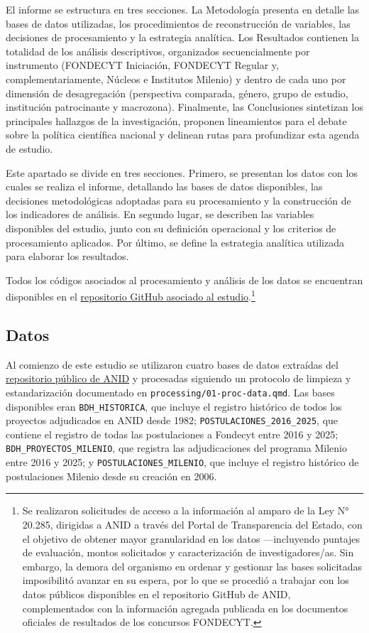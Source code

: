 \documentclass[
  12pt,
  letterpaper,
]{article}
\begin{document}
El informe se estructura en tres secciones. La Metodología presenta en
detalle las bases de datos utilizadas, los procedimientos de
reconstrucción de variables, las decisiones de procesamiento y la
estrategia analítica. Los Resultados contienen la totalidad de los
análisis descriptivos, organizados secuencialmente por instrumento
(FONDECYT Iniciación, FONDECYT Regular y, complementariamente, Núcleos e
Institutos Milenio) y dentro de cada uno por dimensión de desagregación
(perspectiva comparada, género, grupo de estudio, institución
patrocinante y macrozona). Finalmente, las Conclusiones sintetizan los
principales hallazgos de la investigación, proponen lineamientos para el
debate sobre la política científica nacional y delinean rutas para
profundizar esta agenda de estudio.

Este apartado se divide en tres secciones. Primero, se presentan los
datos con los cuales se realiza el informe, detallando las bases de
datos disponibles, las decisiones metodológicas adoptadas para su
procesamiento y la construcción de los indicadores de análisis. En
segundo lugar, se describen las variables disponibles del estudio, junto
con su definición operacional y los criterios de procesamiento
aplicados. Por último, se define la estrategia analítica utilizada para
elaborar los resultados.

Todos los códigos asociados al procesamiento y análisis de los datos se
encuentran disponibles en el
\href{https://github.com/renejcanales/fondos-css}{repositorio GitHub
asociado al estudio}.\footnote{Se realizaron solicitudes de acceso a la
  información al amparo de la Ley N° 20.285, dirigidas a ANID a través
  del Portal de Transparencia del Estado, con el objetivo de obtener
  mayor granularidad en los datos ---incluyendo puntajes de evaluación,
  montos solicitados y caracterización de investigadores/as. Sin
  embargo, la demora del organismo en ordenar y gestionar las bases
  solicitadas imposibilitó avanzar en su espera, por lo que se procedió
  a trabajar con los datos públicos disponibles en el repositorio GitHub
  de ANID, complementados con la información agregada publicada en los
  documentos oficiales de resultados de los concursos FONDECYT.}

\subsection{Datos}\label{datos}

Al comienzo de este estudio se utilizaron cuatro bases de datos
extraídas del \href{https://github.com/ANID-GITHUB}{repositorio público
de ANID} y procesadas siguiendo un protocolo de limpieza y
estandarización documentado en \texttt{processing/01-proc-data.qmd}. Las
bases disponibles eran \texttt{BDH\_HISTORICA}, que incluye el registro
histórico de todos los proyectos adjudicados en ANID desde 1982;
\texttt{POSTULACIONES\_2016\_2025}, que contiene el registro de todas
las postulaciones a Fondecyt entre 2016 y 2025;
\texttt{BDH\_PROYECTOS\_MILENIO}, que registra las adjudicaciones del
programa Milenio entre 2016 y 2025; y \texttt{POSTULACIONES\_MILENIO},
que incluye el registro histórico de postulaciones Milenio desde su
creación en 2006.
\end{document}
